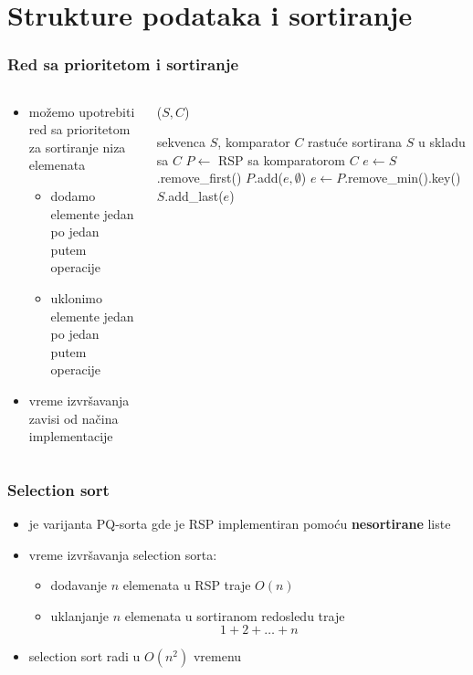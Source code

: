 \documentclass[compress,aspectratio=169]{beamer}
\begin{document}
\section[Sortiranje]{Strukture podataka i sortiranje}
\begin{frame}[fragile]
  \frametitle{Red sa prioritetom i sortiranje}
  \begin{columns}
    \begin{column}[c]{5cm}
      \begin{itemize}
        \item možemo upotrebiti red sa prioritetom za sortiranje niza elemenata
        \begin{itemize}
          \item dodamo elemente jedan po jedan putem  operacije
          \item uklonimo elemente jedan po jedan putem  operacije
        \end{itemize}
        \item vreme izvršavanja zavisi od načina implementacije
      \end{itemize}
    \end{column}
    \begin{column}[c]{6cm}
    ($S, C$)
    \begin{algorithmic}
      \REQUIRE sekvenca $S$, komparator $C$
      \ENSURE rastuće sortirana $S$ u skladu sa $C$
      \STATE $P \leftarrow$ RSP sa komparatorom $C$
        \STATE $e\leftarrow S$.remove\_first()
        \STATE $P$.add($e, \emptyset$)
      \ENDWHILE
        \STATE $e \leftarrow P$.remove\_min().key()
        \STATE $S$.add\_last($e$)
      \ENDWHILE
    \end{algorithmic}    
    \end{column}
  \end{columns}
\end{frame}

\begin{frame}[fragile]
  \frametitle{Selection sort}
  \begin{itemize}
    \item {} je varijanta PQ-sorta gde je RSP implementiran pomoću \textbf{nesortirane} liste
    \item vreme izvršavanja selection sorta:
    \begin{itemize}
      \item dodavanje $n$ elemenata u RSP traje $O(n)$
      \item uklanjanje $n$ elemenata u sortiranom redosledu traje \\
      $$1 + 2 + \ldots + n$$ 
    \end{itemize}
    \item selection sort radi u $O(n^2)$ vremenu
  \end{itemize}
\end{frame}
\end{document}

